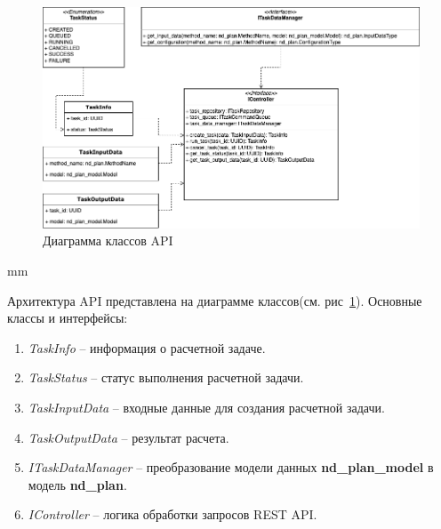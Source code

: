\begin{figure}[H]
	\hspace*{-2.5 cm}\includegraphics[width=1.2\textwidth]{architecture/pictures/executor/api_classes_diagram}
	\caption{Диаграмма классов API}
	\label{pic:architecture__api-classes-diagram}
\end{figure}
 mm

Архитектура API представлена на диаграмме классов(см. рис\ \ref{pic:architecture__api-classes-diagram}).
Основные классы и интерфейсы:
\begin{enumerate}
	\item \textit{TaskInfo} -- информация о расчетной задаче.
	\item \textit{TaskStatus} -- статус выполнения расчетной задачи.
	\item \textit{TaskInputData} -- входные данные для создания расчетной задачи.
	\item \textit{TaskOutputData} -- результат расчета.
	\item \textit{ITaskDataManager} -- преобразование модели данных \textbf{nd\_plan\_model} в модель \textbf{nd\_plan}.
	\item \textit{IController} -- логика обработки запросов REST API.
\end{enumerate}